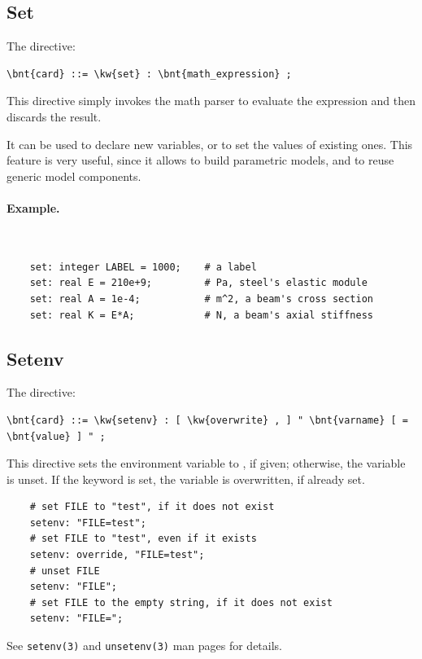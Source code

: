 \subsection{Set}
The  directive:
\begin{Verbatim}[commandchars=\\\{\}]
    \bnt{card} ::= \kw{set} : \bnt{math_expression} ;
\end{Verbatim}
This directive simply invokes the math parser to evaluate the expression
 and then discards the result.

It can be used to declare new variables, or to set the values
of existing ones.
This feature is very useful, since it allows to build parametric models,
and to reuse generic model components.

\paragraph{Example.} \
\begin{verbatim}
    set: integer LABEL = 1000;    # a label
    set: real E = 210e+9;         # Pa, steel's elastic module
    set: real A = 1e-4;           # m^2, a beam's cross section
    set: real K = E*A;            # N, a beam's axial stiffness
\end{verbatim}



\subsection{Setenv}
The  directive:
\begin{Verbatim}[commandchars=\\\{\}]
    \bnt{card} ::= \kw{setenv} : [ \kw{overwrite} , ] " \bnt{varname} [ = \bnt{value} ] " ;
\end{Verbatim}
This directive sets the environment variable  
to , if given; otherwise, the variable
is unset.
If the keyword  is set, the variable is overwritten, 
if already set.
\begin{verbatim}
    # set FILE to "test", if it does not exist
    setenv: "FILE=test";
    # set FILE to "test", even if it exists
    setenv: override, "FILE=test";
    # unset FILE
    setenv: "FILE";
    # set FILE to the empty string, if it does not exist
    setenv: "FILE=";
\end{verbatim}
See \texttt{setenv(3)} and \texttt{unsetenv(3)} man pages for details.




